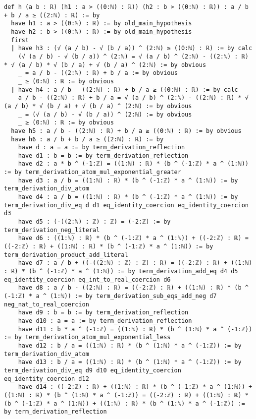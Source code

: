 \documentclass{article}
\begin{document}
\begin{tcolorbox}[colback=white!10, width=\linewidth]
\begin{lstlisting}[language=Lean4]
def h (a b : ℝ) (h1 : a > ((0:ℕ) : ℝ)) (h2 : b > ((0:ℕ) : ℝ)) : a / b + b / a ≥ ((2:ℕ) : ℝ) := by
  have h1 : a > ((0:ℕ) : ℝ) := by old_main_hypothesis
  have h2 : b > ((0:ℕ) : ℝ) := by old_main_hypothesis
  first
  | have h3 : (√ (a / b) - √ (b / a)) ^ (2:ℕ) ≥ ((0:ℕ) : ℝ) := by calc
    (√ (a / b) - √ (b / a)) ^ (2:ℕ) = √ (a / b) ^ (2:ℕ) - ((2:ℕ) : ℝ) * √ (a / b) * √ (b / a) + √ (b / a) ^ (2:ℕ) := by obvious
    _ = a / b - ((2:ℕ) : ℝ) + b / a := by obvious
    _ ≥ (0:ℕ) : ℝ := by obvious
  | have h4 : a / b - ((2:ℕ) : ℝ) + b / a ≥ ((0:ℕ) : ℝ) := by calc
    a / b - ((2:ℕ) : ℝ) + b / a = √ (a / b) ^ (2:ℕ) - ((2:ℕ) : ℝ) * √ (a / b) * √ (b / a) + √ (b / a) ^ (2:ℕ) := by obvious
    _ = (√ (a / b) - √ (b / a)) ^ (2:ℕ) := by obvious
    _ ≥ (0:ℕ) : ℝ := by obvious
  have h5 : a / b - ((2:ℕ) : ℝ) + b / a ≥ ((0:ℕ) : ℝ) := by obvious
  have h6 : a / b + b / a ≥ ((2:ℕ) : ℝ) := by
    have d : a = a := by term_derivation_reflection
    have d1 : b = b := by term_derivation_reflection
    have d2 : a * b ^ (-1:ℤ) = ((1:ℕ) : ℝ) * (b ^ (-1:ℤ) * a ^ (1:ℕ)) := by term_derivation_atom_mul_exponential_greater
    have d3 : a / b = ((1:ℕ) : ℝ) * (b ^ (-1:ℤ) * a ^ (1:ℕ)) := by term_derivation_div_atom
    have d4 : a / b = ((1:ℕ) : ℝ) * (b ^ (-1:ℤ) * a ^ (1:ℕ)) := by term_derivation_div_eq d d1 eq_identity_coercion eq_identity_coercion d3
    have d5 : (-((2:ℕ) : ℤ) : ℤ) = (-2:ℤ) := by term_derivation_neg_literal
    have d6 : ((1:ℕ) : ℝ) * (b ^ (-1:ℤ) * a ^ (1:ℕ)) + ((-2:ℤ) : ℝ) = ((-2:ℤ) : ℝ) + ((1:ℕ) : ℝ) * (b ^ (-1:ℤ) * a ^ (1:ℕ)) := by term_derivation_product_add_literal
    have d7 : a / b + ((-((2:ℕ) : ℤ) : ℤ) : ℝ) = ((-2:ℤ) : ℝ) + ((1:ℕ) : ℝ) * (b ^ (-1:ℤ) * a ^ (1:ℕ)) := by term_derivation_add_eq d4 d5 eq_identity_coercion eq_int_to_real_coercion d6
    have d8 : a / b - ((2:ℕ) : ℝ) = ((-2:ℤ) : ℝ) + ((1:ℕ) : ℝ) * (b ^ (-1:ℤ) * a ^ (1:ℕ)) := by term_derivation_sub_eqs_add_neg d7 neg_nat_to_real_coercion
    have d9 : b = b := by term_derivation_reflection
    have d10 : a = a := by term_derivation_reflection
    have d11 : b * a ^ (-1:ℤ) = ((1:ℕ) : ℝ) * (b ^ (1:ℕ) * a ^ (-1:ℤ)) := by term_derivation_atom_mul_exponential_less
    have d12 : b / a = ((1:ℕ) : ℝ) * (b ^ (1:ℕ) * a ^ (-1:ℤ)) := by term_derivation_div_atom
    have d13 : b / a = ((1:ℕ) : ℝ) * (b ^ (1:ℕ) * a ^ (-1:ℤ)) := by term_derivation_div_eq d9 d10 eq_identity_coercion eq_identity_coercion d12
    have d14 : ((-2:ℤ) : ℝ) + ((1:ℕ) : ℝ) * (b ^ (-1:ℤ) * a ^ (1:ℕ)) + ((1:ℕ) : ℝ) * (b ^ (1:ℕ) * a ^ (-1:ℤ)) = ((-2:ℤ) : ℝ) + ((1:ℕ) : ℝ) * (b ^ (-1:ℤ) * a ^ (1:ℕ)) + ((1:ℕ) : ℝ) * (b ^ (1:ℕ) * a ^ (-1:ℤ)) := by term_derivation_reflection

\end{lstlisting}
\end{tcolorbox}
\end{document}
